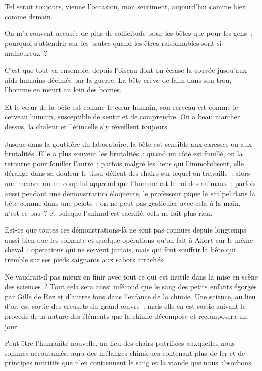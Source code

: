\documentclass[french,twoside]{book} %
\begin{document}
\noindent Tel serait toujours, vienne l’occasion, mon  sentiment, aujourd’hui comme hier, comme demain.\par
On m’a souvent accusée de plus de sollicitude pour les bêtes que pour les gens : pourquoi s’attendrir sur les brutes quand les êtres raisonnables sont si malheureux ?\par
C’est que tout va ensemble, depuis l’oiseau dont on écrase la couvée jusqu’aux nids humains décimés par la guerre. La bête crève de faim dans son trou, l’homme en meurt au loin des bornes.\par
Et le cœur de la bête est comme le cœur humain, son cerveau est comme le cerveau humain, susceptible de sentir et de comprendre. On a beau marcher dessus, la chaleur et l’étincelle s’y réveillent toujours.\par
Jusque dans la gouttière du laboratoire, la bête est sensible aux caresses ou aux brutalités. Elle a plus souvent les brutalités : quand un côté est fouillé, on la retourne pour fouiller l’autre ; parfois malgré les liens qui l’immobilisent, elle dérange dans sa douleur le tissu délicat des chairs sur lequel on travaille : alors une menace ou un coup lui apprend que l’homme est le roi des animaux ; parfois aussi pendant une démonstration éloquente, le professeur pique le scalpel dans la bête comme dans une pelote : on ne peut pas gesticuler avec cela à la main, n’est-ce pas ? et  puisque l’animal est sacrifié, cela ne fait plus rien.\par
Est-ce que toutes ces démonstrations-là ne sont pas connues depuis longtemps aussi bien que les soixante et quelque opérations qu’on fait à Alfort sur le même cheval ; opérations qui ne servent jamais, mais qui font souffrir la bête qui tremble sur ses pieds saignants aux sabots arrachés.\par
Ne vaudrait-il pas mieux en finir avec tout ce qui est inutile dans la mise en scène des sciences ? Tout cela sera aussi infécond que le sang des petits enfants égorgés par Gille de Rez et d’autres fous dans l’enfance de la chimie. Une science, au lieu d’or, est sortie des creusets du grand œuvre ; mais elle en est sortie suivant le procédé de la nature des éléments que la chimie décompose et recomposera un jour.\par
Peut-être l’humanité nouvelle, au lieu des chairs putrifiées auxquelles nous sommes accoutumés, aura des mélanges chimiques contenant plus de fer et de principes nutritifs que n’en contiennent le sang et la viande que nous absorbons.\par
\end{document}
